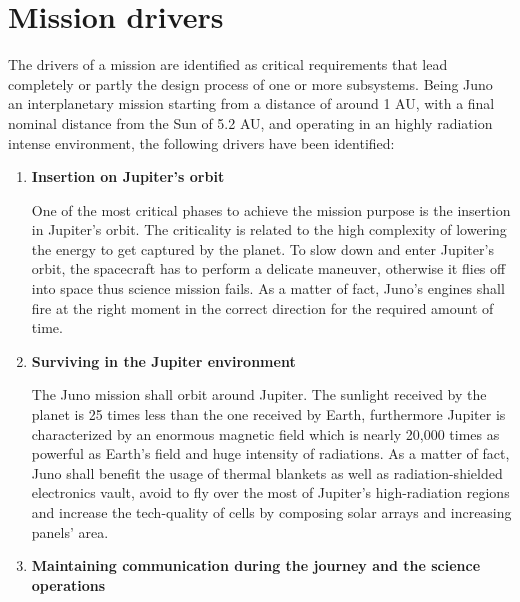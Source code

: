 \section{Mission drivers}
\label{sec:drivers}

The drivers of a mission are identified as critical requirements that lead completely or partly the design process of one or more subsystems. Being Juno an interplanetary mission starting from a distance of around 1 AU, with a final nominal distance from the Sun of 5.2 AU, and operating in an highly radiation intense environment, the following drivers have been identified: 

\begin{enumerate}
    \item \textbf{Insertion on Jupiter’s orbit} \cite{fact_sheet} \cite{video_1h} \cite{Juno_launch} \cite{Key_requirements} 
    
    One of the most critical phases to achieve the mission purpose is the insertion in Jupiter’s orbit. The criticality is related to the high complexity of lowering the energy to get captured by the planet. To slow down and enter Jupiter’s orbit, the spacecraft has to perform a delicate maneuver, otherwise it flies off into space thus science mission fails. As a matter of fact, Juno’s engines shall fire at the right moment in the correct direction for the required amount of time. 

    \item \textbf{Surviving in the Jupiter environment} \cite{fact_sheet} \cite{2006_overview} \cite{atmosphere}
    
    The Juno mission shall orbit around Jupiter. The sunlight received by the planet is 25 times less than the one received by Earth, furthermore Jupiter is characterized by an enormous magnetic field which is nearly 20,000 times as powerful as Earth’s field and huge intensity of radiations. As a matter of fact, Juno shall benefit the usage of thermal blankets as well as radiation-shielded electronics vault, avoid to fly over the most of Jupiter’s high-radiation regions and increase the tech-quality of cells by composing solar arrays and increasing panels’ area.
   
    \item \textbf{Maintaining communication during the journey and the science operations}\cite{Juno_launch}\cite{communication_support}
    

\end{enumerate}
